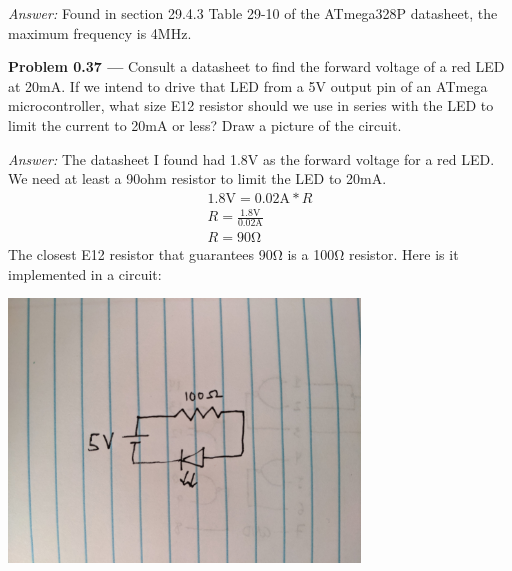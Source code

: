 \documentclass[11pt]{article}
\newcommand{\problem}[1]{\textbf{Problem #1 ---} }
\newcommand{\answer}{\textit{Answer: } }
\begin{document}
\answer Found in section 29.4.3 Table 29-10 of the ATmega328P datasheet, the maximum frequency is 4\si{\mega\hertz}.

\problem{0.37} Consult a datasheet to find the forward voltage of a red LED
  at 20\si{\milli\ampere}.  If we intend to drive that LED from a
  5\si{\volt} output pin of an ATmega microcontroller, what size E12
  resistor should we use in series with the LED to limit the current to
  20\si{\milli\ampere} or less?  Draw a picture of the circuit.

\answer The datasheet I found had 1.8\si{\volt} as the forward voltage for a red LED. 
We need at least a 90\si{ohm} resistor to limit the LED to 20\si{\milli\ampere}.
\begin{align*}
1.8\si{\volt} = 0.02\si{\ampere} * R\\
R = \frac{1.8\si{\volt}}{0.02\si{\ampere}}\\
R = 90\si{\ohm}
\end{align*}
The closest E12 resistor that guarantees 90\si{\ohm} is a 100\si{\ohm} resistor.
Here is it implemented in a circuit:
\begin{center}
\includegraphics[width=0.7\textwidth]{problem37.jpg}
\end{center}
\end{document}
